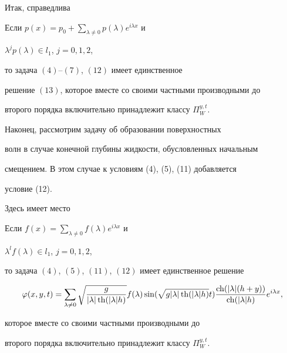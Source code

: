  


Итак, справедлива 


 


\begin{thm} 


Если $p(x)=p_0+\sum\limits_{\lambda\ne0}p(\lambda)e^{i\lambda x}$ и 


$\lambda^j p(\lambda)\in l_1$, $j=0,1,2$, 


то задача $(4)$--$(7)$, $(12)$ имеет единственное 


решение $(13)$, которое вместе со своими частными производными до 


второго порядка включительно принадлежит классу $\Pi^{y,t}_W$. 


\end{thm} 


 


Наконец, рассмотрим задачу об образовании поверхностных 


волн в случае конечной глубины жидкости, обусловленных начальным 


смещением. В этом случае к условиям (4), (5), (11) добавляется 


условие (12). 


 


Здесь имеет место 


 


\begin{thm} 


Если $f(x)=\sum\limits_{\lambda\ne0}f(\lambda)e^{i\lambda x}$ и 


$\lambda^l f(\lambda)\in l_1$, $j=0,1,2$, 


то задача $(4)$, $(5)$, $(11)$, $(12)$ имеет единственное решение 


$$ 


\varphi(x,y,t)=\sum_{\lambda\ne0} 


\sqrt{\frac{g}{|\lambda|\th(|\lambda|h)}}f(\lambda)\sin 


(\sqrt{g|\lambda|\th(|\lambda|h)}t) 


\frac{\ch(|\lambda|(h+y))}{\ch(|\lambda|h)}e^{i\lambda x},


$$ 


которое вместе со своими частными производными до 


второго порядка включительно принадлежит классу $\Pi^{y,t}_W$. 


\end{thm} 


